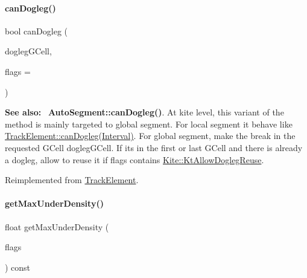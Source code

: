 \paragraph{\texorpdfstring{can\+Dogleg()}{canDogleg()}\hspace{0.1cm}{\footnotesize\ttfamily [3/3]}}
{\footnotesize\ttfamily bool can\+Dogleg (\begin{DoxyParamCaption}\item[{\textbf{ Katabatic\+::\+G\+Cell} $\ast$}]{dogleg\+G\+Cell,  }\item[{unsigned int}]{flags = {} }\end{DoxyParamCaption})\hspace{0.3cm}{\ttfamily [virtual]}}

{\bfseries See also\+:}~ \textbf{ Auto\+Segment\+::can\+Dogleg()}. At kite level, this variant of the method is mainly targeted to global segment. For local segment it behave like \hyperlink{classKite_1_1TrackElement_accb4c6a7ee2678a0cff4dbc4a7860fe1}{Track\+Element\+::can\+Dogleg(\+Interval)}. For global segment, make the break in the requested G\+Cell {\ttfamily dogleg\+G\+Cell}. If it\textquotesingle{}s in the first or last G\+Cell and there is already a dogleg, allow to reuse it if {\ttfamily flags} contains \hyperlink{namespaceKite_acca8fffa3182dea5f94208f454f14b47a766f453d6caa06490196a952762f0bb8}{Kite\+::\+Kt\+Allow\+Dogleg\+Reuse}. 

Reimplemented from \hyperlink{classKite_1_1TrackElement_a4f040cf33009e4886d401115c3bea838}{Track\+Element}.

\mbox{\label{classKite_1_1TrackSegment_abb61228ad7b29c19c6428902d34126f7}} 
\paragraph{\texorpdfstring{get\+Max\+Under\+Density()}{getMaxUnderDensity()}}
{\footnotesize\ttfamily float get\+Max\+Under\+Density (\begin{DoxyParamCaption}\item[{unsigned int}]{flags }\end{DoxyParamCaption}) const\hspace{0.3cm}{\ttfamily [virtual]}}

